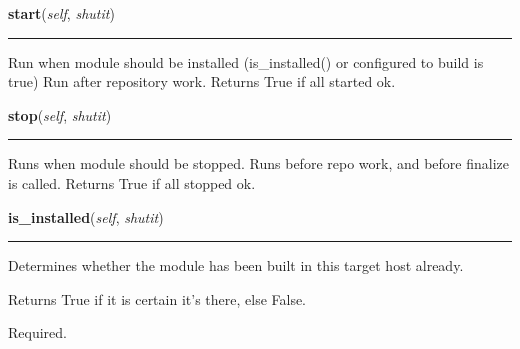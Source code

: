     \label{shutit_module:ShutItModule:start}

    \vspace{0.5ex}

\hspace{.8\funcindent}\begin{boxedminipage}{\funcwidth}

    \raggedright \textbf{start}(\textit{self}, \textit{shutit})

    \vspace{-1.5ex}

    \rule{\textwidth}{0.5\fboxrule}
\setlength{\parskip}{2ex}
    Run when module should be installed (is\_installed() or configured to 
    build is true) Run after repository work. Returns True if all started 
    ok.

\setlength{\parskip}{1ex}
    \end{boxedminipage}

    \label{shutit_module:ShutItModule:stop}

    \vspace{0.5ex}

\hspace{.8\funcindent}\begin{boxedminipage}{\funcwidth}

    \raggedright \textbf{stop}(\textit{self}, \textit{shutit})

    \vspace{-1.5ex}

    \rule{\textwidth}{0.5\fboxrule}
\setlength{\parskip}{2ex}
    Runs when module should be stopped. Runs before repo work, and before 
    finalize is called. Returns True if all stopped ok.

\setlength{\parskip}{1ex}
    \end{boxedminipage}

    \label{shutit_module:ShutItModule:is_installed}

    \vspace{0.5ex}

\hspace{.8\funcindent}\begin{boxedminipage}{\funcwidth}

    \raggedright \textbf{is\_installed}(\textit{self}, \textit{shutit})

    \vspace{-1.5ex}

    \rule{\textwidth}{0.5\fboxrule}
\setlength{\parskip}{2ex}
    Determines whether the module has been built in this target host 
    already.

    Returns True if it is certain it's there, else False.

    Required.

\setlength{\parskip}{1ex}
    \end{boxedminipage}

